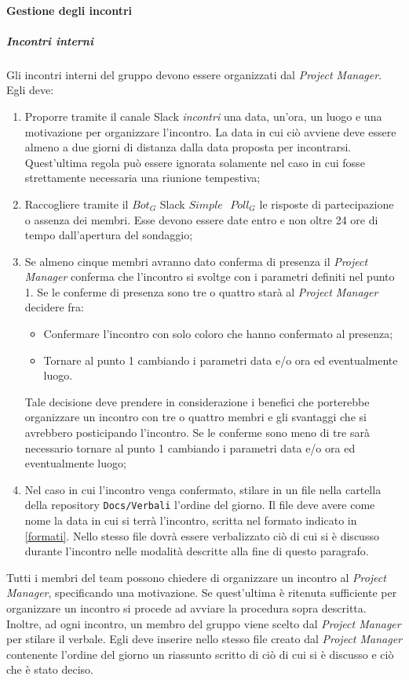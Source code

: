 		\paragraph{Gestione degli incontri}
			\subparagraph{Incontri interni} \Spazio
			 Gli incontri interni del gruppo devono essere organizzati dal \emph{Project Manager}. Egli deve:
			\begin{enumerate}
				\item Proporre tramite il canale Slack \emph{incontri} una data, un'ora, un luogo e una motivazione per organizzare l'incontro. La data in cui ciò avviene deve essere almeno a due giorni di distanza dalla data proposta per incontrarsi. Quest'ultima regola può essere ignorata solamente nel caso in cui fosse strettamente necessaria una riunione tempestiva;
				
				\item Raccogliere tramite il $Bot_G$ Slack $Simple\textbf{ }Poll_G$ le risposte di partecipazione o assenza dei membri. Esse devono essere date entro e non oltre 24 ore di tempo dall'apertura del sondaggio;
				
				\item Se almeno cinque membri avranno dato conferma di presenza il \emph{Project Manager} conferma che l'incontro si svoltge con i parametri definiti nel punto 1. 
				Se le conferme di presenza sono tre o quattro starà al \emph{Project Manager} decidere fra: 
				\begin{itemize}
					\item Confermare l'incontro con solo coloro che hanno confermato al presenza;
					\item Tornare al punto 1 cambiando i parametri data e/o ora ed eventualmente luogo.
				\end{itemize}
				Tale decisione deve prendere in considerazione i benefici che porterebbe organizzare un incontro con tre o quattro membri e gli svantaggi che si avrebbero posticipando l'incontro.
				Se le conferme sono meno di tre sarà necessario tornare al punto 1 cambiando i parametri data e/o ora ed eventualmente luogo;
				
				\item Nel caso in cui l'incontro venga confermato, stilare in un file nella cartella della repository \texttt{Docs/Verbali} l'ordine del giorno. Il file deve avere come nome la data in cui si terrà l'incontro, scritta nel formato indicato in \ref{formati}. Nello stesso file dovrà essere verbalizzato ciò di cui si è discusso durante l'incontro nelle modalità descritte alla fine di questo paragrafo.
			\end{enumerate}
			Tutti i membri del team possono chiedere di organizzare un incontro al \emph{Project Manager}, specificando una motivazione. Se quest'ultima è ritenuta sufficiente per organizzare un incontro si procede ad avviare la procedura sopra descritta. 
			\\Inoltre, ad ogni incontro, un membro del gruppo viene scelto dal \emph{Project Manager} per stilare il verbale. Egli deve inserire nello stesso file creato dal \emph{Project Manager} contenente l'ordine del giorno un riassunto scritto di ciò di cui si è discusso e ciò che è stato deciso.
			
